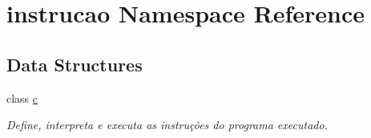 \hypertarget{namespaceinstrucao}{}\section{instrucao Namespace Reference}
\label{namespaceinstrucao}
\subsection*{Data Structures}
\begin{DoxyCompactItemize}
\item 
class \hyperlink{classinstrucao_1_1c}{c}
\begin{DoxyCompactList}\small\item\em Define, interpreta e executa as instruções do programa executado. \end{DoxyCompactList}\end{DoxyCompactItemize}
